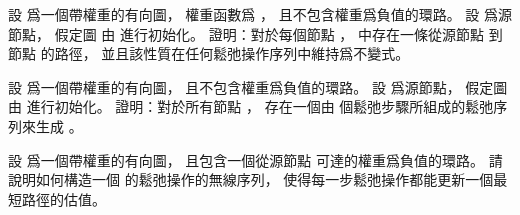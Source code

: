 \startEXERCISE
設  爲一個帶權重的有向圖，
權重函數爲 ，
且不包含權重爲負值的環路。
設  爲源節點，
假定圖  由  進行初始化。
證明：對於每個節點 ，  中存在一條從源節點  到節點  的路徑，
並且該性質在任何鬆弛操作序列中維持爲不變式。
\stopEXERCISE

\startANSWER
{}
\stopANSWER

\startEXERCISE
設  爲一個帶權重的有向圖，
且不包含權重爲負值的環路。
設  爲源節點，
假定圖  由  進行初始化。
證明：對於所有節點 ，
存在一個由  個鬆弛步驟所組成的鬆弛序列來生成 。
\stopEXERCISE

\startANSWER
{}
\stopANSWER

\startEXERCISE
設  爲一個帶權重的有向圖，
且包含一個從源節點  可達的權重爲負值的環路。
請說明如何構造一個  的鬆弛操作的無線序列，
使得每一步鬆弛操作都能更新一個最短路徑的估值。
\stopEXERCISE

\startANSWER
{}
\stopANSWER

\stopsection

